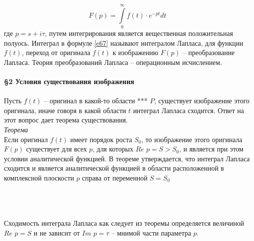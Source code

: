 \documentclass{article}
\numberwithin{equation}{section}
\begin{document}
\begin{equation}\label{e67}
F(p)=\int\limits_0^\infty f(t)\cdot e^{-pt}dt
\end{equation}
где $p=s+i\tau$, путем интегрирования является вещественная положительная полуось. Интеграл в формуле \eqref{e67} называют интегралом Лапласа, для функции $f(t)$, переход от оригинала $f(t)$ к изображению $F(p)$ -- преобразование Лапласа. Теория преобразований Лапласа -- операционным исчислением.
\\\\
\textbf{\large{\S2 Условия существования изображения}}
\\\\
Пусть $f(t)$ -- оригинал в какой-то области \colorbox{red!50}{***} $P$, существует изображение этого оригинала, иначе говоря в какой области $t$ интеграл Лапласа сходится. Ответ на этот вопрос дает теорема существования.\\
\textit{Теорема}\\
Если оригинал $f(t)$ имеет порядок роста $S_0$, то изображение этого оригинала $F(p)$ существует для всех $p$, для которых $Re$ $p=S>S_0$, и является при этом условии аналитической функцией. В теореме утверждается, что интеграл Лапласа сходится и является аналитической функцией в области расположенной в комплексной плоскости $p$ справа от переменной $S=S_0$\\\\
\\\\
Сходимость интеграла Лапласа как следует из теоремы определяется величиной $Re$ $p=S$ и не зависит от $Im$ $p=\tau$ -- мнимой части параметра $p$.
\end{document}
